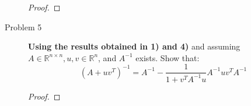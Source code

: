 \documentclass{article}
\begin{document}
\begin{description}
\begin{proof}
	      \end{proof}
	\item[Problem 5] \textbf{Using the results obtained in 1) and 4)} and assuming $A \in \mathbb{R}^{n\times n}, \textit{u}, \textit{v} \in \mathbb{R}^n$, and $A^{-1}$ exists. Show that:
	      $$ (A+\textit{u}\textit{v}^T)^{-1} = A^{-1} - \frac{1}{1 + \textit{v}^TA^{-1}\textit{u}}A^{-1}\textit{u}\textit{v}^TA^{-1}$$
	      \begin{proof}

	      \end{proof}
\end{description}
\end{document}
